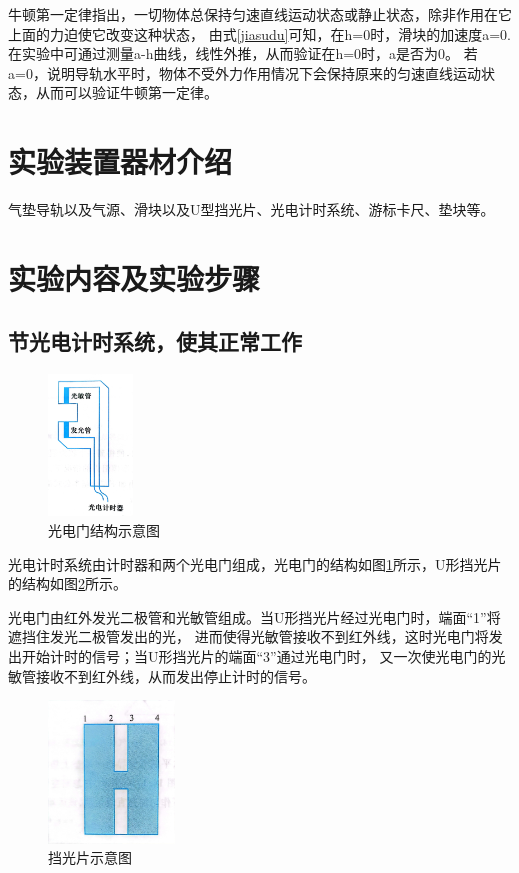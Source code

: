 \documentclass{ctexart}
\begin{document}
牛顿第一定律指出，一切物体总保持匀速直线运动状态或静止状态，除非作用在它上面的力迫使它改变这种状态，
由式\ref{jiasudu}可知，在h=0时，滑块的加速度a=0.
在实验中可通过测量a-h曲线，线性外推，从而验证在h=0时，a是否为0。
若a=0，说明导轨水平时，物体不受外力作用情况下会保持原来的匀速直线运动状态，从而可以验证牛顿第一定律。

\section{实验装置器材介绍}
气垫导轨以及气源、滑块以及U型挡光片、光电计时系统、游标卡尺、垫块等。

\section{实验内容及实验步骤}
  \subsection{节光电计时系统，使其正常工作}
  
  \begin{figure}[H]
    \centering
    \includegraphics[height=0.2\textheight,width=0.2\textwidth]{guangdianmen.jpg}
    \caption{光电门结构示意图}\label{guangdianmen}
  \end{figure}

  光电计时系统由计时器和两个光电门组成，光电门的结构如图\ref{guangdianmen}所示，U形挡光片的结构如图\ref{dangguangpian}所示。

  光电门由红外发光二极管和光敏管组成。当U形挡光片经过光电门时，端面“1”将遮挡住发光二极管发出的光，
  进而使得光敏管接收不到红外线，这时光电门将发出开始计时的信号；当U形挡光片的端面“3”通过光电门时，
  又一次使光电门的光敏管接收不到红外线，从而发出停止计时的信号。

  \begin{figure}[H]
    \centering
    \includegraphics[height=0.2\textheight,width=0.3\textwidth]{dangguangpian.jpg}
    \caption{挡光片示意图}\label{dangguangpian}
  \end{figure}
\end{document}
